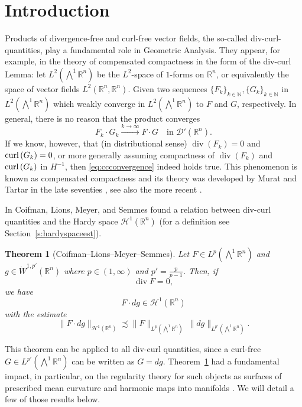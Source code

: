 \documentclass[12pt]{amsart}
\def\N{{\mathbb N}}
\newtheorem{theorem}{Theorem}
\theoremstyle{definition}
\def\curl{{\rm curl\,}}
\newcommand{\R}{\mathbb{R}}
\newcommand{\Ep}{\bigwedge\nolimits}
\numberwithin{theorem}{section} \numberwithin{equation}{section}
\renewcommand{\div}{\operatorname{div}}
\newcommand{\aleq}{\precsim}
\begin{document}
\section{Introduction}
Products of divergence-free and curl-free vector fields, the so-called div-curl-quantities, play a fundamental role in Geometric Analysis. They appear, for example, in the theory of compensated compactness in the form of the div-curl Lemma: 
let $L^2(\Ep^1 \R^n)$ be the $L^2$-space of $1$-forms on $\R^n$, or equivalently the space of vector fields $L^2(\R^n,\R^n)$. Given two sequences $\{F_k\}_{k \in \N}, \{G_k\}_{k \in \N}$ in $L^2(\Ep^1 \R^n)$ which weakly converge in $L^2(\Ep^1 \R^n)$ to $F$ and $G$, respectively. In general, there is no reason that the product converges
\begin{equation}\label{eq:ccconvergence} F_k \cdot G_k \xrightarrow{k \to \infty} F\cdot G \quad \mbox{in }\mathcal{D}'(\R^n).\end{equation}
If we know, however, that (in distributional sense) $\div(F_k) = 0$ and $\curl(G_k) = 0$, or more generally assuming compactness of $\div(F_k)$ and $\curl(G_k)$ in $H^{-1}$, then \eqref{eq:ccconvergence} indeed holds true.
This phenomenon is known as compensated compactness and its theory was developed by Murat and Tartar in the late seventies \cite{Murat-1978,Murat-1981,Tartar-1978,Tartar-1979,Tartar-1982}, see also the more recent \cite{Briane-Casado-Diaz-Murat-2009, Conti-Dolzmann-Mueller}. 

In \cite{CLMS-1993} Coifman, Lions, Meyer, and Semmes found a relation between div-curl quantities and the Hardy space $\mathcal{H}^1(\R^n)$ (for a definition see Section~\ref{s:hardyspaceest}). 

\begin{theorem}[Coifman--Lions--Meyer--Semmes]\label{th:clms}
Let $F \in L^p(\Ep^1 \R^n)$ and $g \in \dot{W}^{1,p'}(\R^n)$ where $p \in (1,\infty)$ and $p' = \frac{p}{p-1}$. Then, if 
\[
 \div F = 0,
\]
we have
\[
 F \cdot dg \in \mathcal{H}^1(\R^n)
\]
with the estimate
\[
 \|F \cdot d g\|_{\mathcal{H}^1(\R^n)} \aleq \|F\|_{L^p(\Ep^1 \R^n)}\ \|d g\|_{L^{p'}(\Ep^1 \R^n)}.
\]
\end{theorem}
% 
This theorem can be applied to all div-curl quantities, since a curl-free $G \in L^{p'}(\Ep^1 \R^n)$ can be written as $G = d g$. Theorem~\ref{th:clms} had a fundamental impact, in particular, on the regularity theory for such objects as surfaces of prescribed mean curvature and harmonic maps into manifolds \cite{Helein90,Helein91-sym,Helein91,Bethuel-1992,Riviere-2007}. We will detail a few of those results below.
% 
\end{document}

